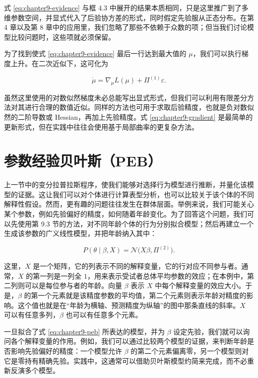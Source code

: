 式 \eqref{eq:chapter9-evidence} 与框 4.3 中展开的结果本质相同，只是这里推广到了多维参数空间，并显式代入了后验协方差的形式，同时假定先验服从正态分布。在第 4 章以及第 8 章中的应用里，我们忽略了那些不依赖于众数的项；但当我们讨论模型比较问题时，这些项就必须保留。

为了找到使式 \eqref{eq:chapter9-evidence} 最后一行达到最大值的 $\mu$，我们可以执行梯度上升。在二次近似下，这可化为

\begin{equation}
\dot{\mu}=\nabla_{\mu}L(\mu)+\Pi^{(1)}\varepsilon.
\label{eq:chapter9-gradient}
\end{equation}

虽然这里使用的对数似然梯度未必总能写出显式形式，但我们可以利用有限差分方法对其进行合理的数值近似。同样的方法也可用于求取后验精度，也就是负对数似然的二阶导数或 Hessian，再加上先验精度。式 \eqref{eq:chapter9-gradient} 是最简单的更新形式，但在实践中往往会使用基于局部曲率的更复杂方法。

\section{参数经验贝叶斯（PEB）}

上一节中的变分拉普拉斯程序，使我们能够对选择行为模型进行推断，并量化该模型的证据。这让我们可以对个体进行计算表型分析，也可以比较关于该个体的不同解释性假设。然而，更有趣的问题往往发生在群体层面。举例来说，我们可能关心某个参数，例如先验偏好的精度，如何随着年龄变化。为了回答这个问题，我们可以先使用第 9.3 节的方法，对不同年龄个体的行为分别拟合模型；然后再建立一个生成该参数的广义线性模型，并把年龄纳入其中：

\begin{equation}
P(\theta \mid \beta,X)=\mathcal{N}\!\bigl(X\beta,\Pi^{(2)}\bigr).
\label{eq:chapter9-peb}
\end{equation}

这里，$X$ 是一个矩阵，它的列表示不同的解释变量，它的行对应不同参与者。通常，$X$ 的第一列是一列全 $1$，用来表示受试者总体平均参数的效应；在本例中，第二列则可以是每位参与者的年龄。向量 $\beta$ 表示 $X$ 中每个解释变量的效应大小。于是，$\beta$ 的第一个元素就是该精度参数的平均值，第二个元素则表示年龄对精度的影响。这个值也就是在“年龄为横轴、预测精度为纵轴”的图中那条直线的斜率。$X$ 可以有任意多列，$\beta$ 也可以有任意多个元素。

一旦拟合了式 \eqref{eq:chapter9-peb} 所表达的模型，并为 $\beta$ 设定先验，我们就可以询问各个解释变量的作用。例如，我们可以通过比较两个模型的证据，来判断年龄是否影响先验偏好的精度：一个模型允许 $\beta$ 的第二个元素偏离零，另一个模型则对它是零持有精确先验。实践中，这通常可以借助贝叶斯模型约简来完成，而不必重新反演多个模型。

